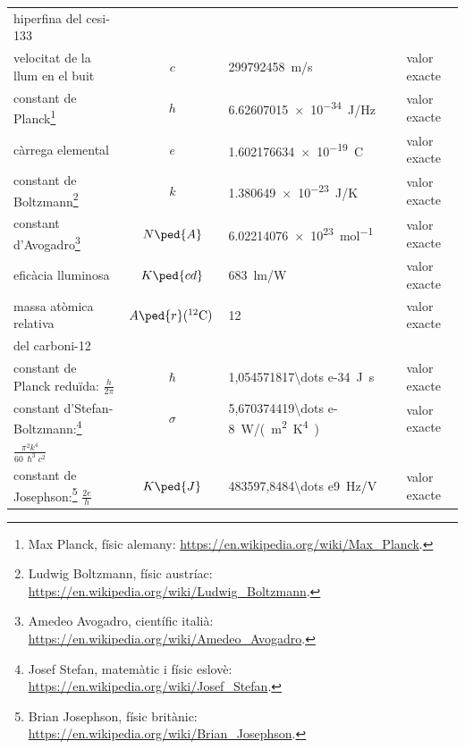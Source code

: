 \begin{ThreePartTable}
\begin{longtable}{lcll}
	hiperfina del cesi-133 & & & \index{$\Delta\nu\ped{Cs}$}\\[1em]
	velocitat de la llum en el buit & $c$ & \qty{299 792 458}{m/s} & valor exacte \index{c@$c$}\\[1em]
	constant de Planck\footnote{Max  Planck, físic alemany: \href{https://en.wikipedia.org/wiki/Max_Planck}{https:/\!\!/en.wikipedia.org/wiki/Max\_Planck}.} & $h$ & \qty{6,62607015 e-34}{J/Hz} & valor exacte\index{constants!de Planck}\index{h@$h$}\\[1em]
	càrrega elemental & $e$ & \qty{1,602176634 e-19}{C} & valor exacte\index{carrega@càrrega!elemental}\index{e@$e$}\\[1em]
	constant de Boltzmann\footnote{Ludwig  Boltzmann, físic austríac: \href{https://en.wikipedia.org/wiki/Ludwig_Boltzmann}{https:/\!\!/en.wikipedia.org/wiki/Ludwig\_Boltzmann}.} & $k$ & \qty{1,380649e-23}{J/K} & valor exacte\index{constants!de Boltzmann}\index{k@$k$}\\[1em]
	constant d'Avogadro\tnote{\color{blue}(a)}\hspace{4mm}\footnote{Amedeo Avogadro, científic italià: \href{https://en.wikipedia.org/wiki/Amedeo_Avogadro}{https:/\!\!/en.wikipedia.org/wiki/Amedeo\_Avogadro}.} & $N\ped{A}$ & \qty{6,02214076 e23}{mol^{-1}} & valor exacte\index{constants!d'Avogadro}\index{NA@$N\ped{A}$}\\[1em]
	eficàcia lluminosa\tnote{\color{blue}(b)} & $K\ped{cd}$ & \qty{683}{lm/W} & valor exacte\index{eficàcia lluminosa}\index{Kcd@$K\ped{cd}$}\\[1em]
	massa atòmica relativa\tnote{\color{blue}(c)} & $A\ped{r}({}^{12}\mathrm{C})\,$ & 12 & valor exacte\\
	del carboni-12 & & &\index{massa!atòmica relativa del carboni-12}\index{Ar@$A\ped{r}({}^{12}\mathrm{C})$}\\[1em]
	constant de Planck reduïda: $\frac{h}{2\pi}$ & $\hslash$ & \qty{1,054571817\dots e-34}{J.s} & valor exacte\index{constants!de Planck redu\"{i}da}\index{h@$\hslash$}\\[.8em]
	constant d'Stefan-Boltzmann:\footnote{Josef Stefan, matemàtic i físic eslovè: \href{https://en.wikipedia.org/wiki/Josef_Stefan}{https:/\!\!/en.wikipedia.org/wiki/Josef\_Stefan}.}  & $\sigma$ & \qty{5,670374419\dots e-8}{W/(m^2.K^4)} & valor exacte\index{constants!d'Stefan-Boltzmann}\index{$\sigma$}\\ 
	$\frac{\pi^2 k^4}{60\, \hslash^3 c^2}$ & & & \\[0.8em]
	constant de Josephson:\footnote{Brian Josephson, físic britànic: \href{https://en.wikipedia.org/wiki/Brian_Josephson}{https:/\!\!/en.wikipedia.org/wiki/Brian\_Josephson}.} $\frac{2 e}{h}$ & $K\ped{J}$ & \qty{483597,8484\dots e9}{Hz/V} & valor exacte\index{constants!de Josephson}\index{KJ@$K\ped{J}$}\\[0.9em]

\end{longtable}
\end{ThreePartTable}
